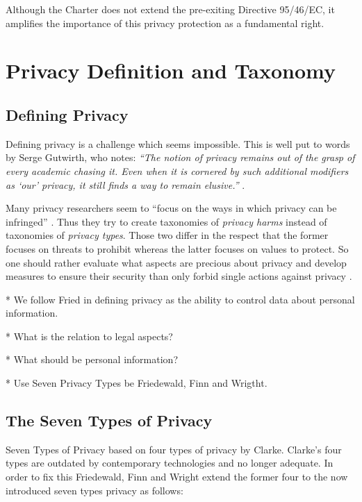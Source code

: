 Although the Charter does not extend the pre-exiting Directive 95/46/EC, it amplifies the importance of this privacy protection as a fundamental right.

\section{Privacy Definition and Taxonomy}
\label{sec:taxonomy}

\subsection{Defining Privacy}

Defining privacy is a challenge which seems impossible. This is well put to words by Serge Gutwirth, who notes: \emph{``The notion of privacy remains out of the grasp of every academic chasing it. Even when it is cornered by such additional modifiers as `our' privacy, it still finds a way to remain elusive.''} \cite{2}.

Many privacy researchers seem to ``focus on the ways in which privacy can be infringed'' \cite{1}.
Thus they try to create taxonomies of \emph{privacy harms} instead of taxonomies of \emph{privacy types}.
Those two differ in the respect that the former focuses on threats to prohibit whereas the latter focuses on values to protect.
So one should rather evaluate what aspects are precious about privacy and develop measures to ensure their security than only forbid single actions against privacy \cite{1}.


* We follow Fried in defining privacy as the ability to control data about personal information.

* What is the relation to legal aspects?

* What should be personal information?

* Use Seven Privacy Types be Friedewald, Finn and Wrigtht.

\subsection{The Seven Types of Privacy}

Seven Types of Privacy based on four types of privacy by Clarke.
Clarke's four types are outdated by contemporary technologies and no longer adequate. 
In order to fix this Friedewald, Finn and Wright extend the former four to the now introduced seven types privacy as follows:

